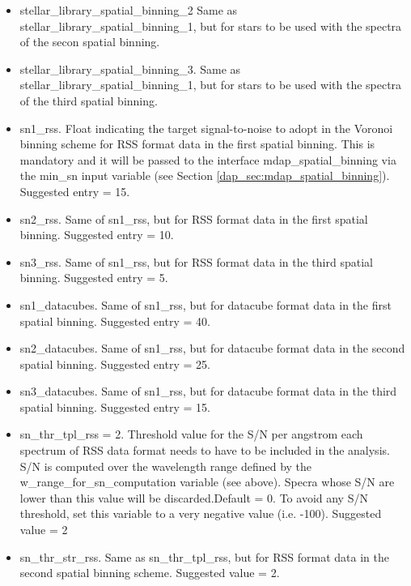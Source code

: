 \begin{itemize}
  \item stellar\_library\_spatial\_binning\_2 Same as
    stellar\_library\_spatial\_binning\_1, but for stars to be used
    with the spectra of the secon spatial binning.


  \item stellar\_library\_spatial\_binning\_3. Same as
    stellar\_library\_spatial\_binning\_1, but for stars to be used
    with the spectra of the third spatial binning.


  \item sn1\_rss. Float indicating the target signal-to-noise to adopt
    in the Voronoi binning scheme for RSS format data in the first
    spatial binning. This is mandatory and it will be passed to the
    interface mdap\_spatial\_binning via the min\_sn input variable
    (see Section \ref{dap_sec:mdap_spatial_binning}). Suggested entry
    = 15.

  \item sn2\_rss. Same of sn1\_rss, but for RSS format data in the
    first spatial binning. Suggested entry = 10.

  \item sn3\_rss. Same of sn1\_rss, but for RSS format data in the
    third spatial binning. Suggested entry = 5.

  \item sn1\_datacubes.  Same of sn1\_rss, but for datacube format
    data in the first spatial binning. Suggested entry = 40.

  \item sn2\_datacubes.  Same of sn1\_rss, but for datacube format
    data in the second spatial binning. Suggested entry = 25.

  \item sn3\_datacubes.  Same of sn1\_rss, but for datacube format
    data in the third spatial binning. Suggested entry = 15.

  \item sn\_thr\_tpl\_rss = 2. Threshold value for the S/N per
    angstrom each spectrum of RSS data format needs to have to be
    included in the analysis. S/N is computed over the wavelength
    range defined by the w\_range\_for\_sn\_computation variable (see
    above). Specra whose S/N are lower than this value will be
    discarded.Default = 0. To avoid any S/N threshold, set this
    variable to a very negative value (i.e. -100). Suggested value = 2

  \item sn\_thr\_str\_rss. Same as sn\_thr\_tpl\_rss, but for RSS
    format data in the second spatial binning scheme.  Suggested value
    = 2.


\end{itemize}
